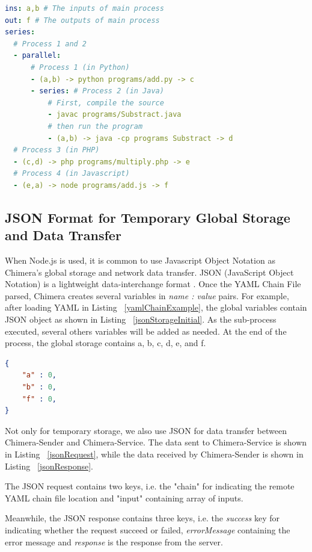 \documentclass[conference]{IEEEtran}
\begin{document}
\begin{lstlisting}[caption=YAML Chain With Shorthand, label=yamlShort, language=yaml, basicstyle=\small, breaklines=true]
ins: a,b # The inputs of main process 
out: f # The outputs of main process 
series:
  # Process 1 and 2 
  - parallel:
      # Process 1 (in Python) 
      - (a,b) -> python programs/add.py -> c
      - series: # Process 2 (in Java) 
          # First, compile the source  
          - javac programs/Substract.java
          # then run the program 
          - (a,b) -> java -cp programs Substract -> d
  # Process 3 (in PHP) 
  - (c,d) -> php programs/multiply.php -> e
  # Process 4 (in Javascript) 
  - (e,a) -> node programs/add.js -> f
\end{lstlisting}


\subsection{JSON Format for Temporary Global Storage and Data Transfer}

When Node.js is used, it is common to use Javascript Object Notation as Chimera's
global storage and network data transfer. JSON (JavaScript Object Notation) is a 
lightweight data-interchange format \cite{json}. Once the YAML Chain File parsed, Chimera creates several variables in {\it name : 
value} pairs. For example, after loading YAML in Listing ~\ref{yamlChainExample}, the
global variables contain JSON object as shown in Listing ~\ref{jsonStorageInitial}. As the sub-process executed, several others variables will be added as needed. At the
end of the process, the global storage contains a, b, c, d, e, and f.

\begin{lstlisting}[caption=Initial content of JSON Storage, label=jsonStorageInitial, language=json, basicstyle=\small, breaklines=true]
{
    "a" : 0,
    "b" : 0,
    "f" : 0,
}
\end{lstlisting}

Not only for temporary storage, we also use JSON for data transfer between 
Chimera-Sender and Chimera-Service. The data sent to Chimera-Service is shown in Listing
~\ref{jsonRequest}, while the data received by Chimera-Sender is shown in Listing
~\ref{jsonResponse}.

The JSON request contains two keys, i.e. the "chain" for 
indicating the remote YAML chain file location and "input" containing array of inputs.

Meanwhile, the JSON response contains three keys, i.e. the {\it success} key for indicating
whether the request succeed or failed, {\it errorMessage} containing the error message and
{\it response} is the response from the server.
\end{document}
